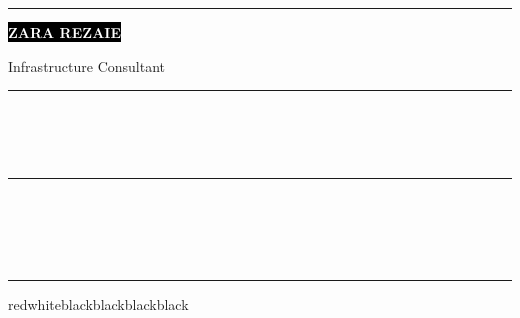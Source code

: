 \documentclass[9pt]{developercv} %
\begin{document}
	
	\begin{minipage}[t]{0.45\textwidth}\hrule height 0pt width 0pt%
		\colorbox{black}{{\HUGE\textcolor{white}{\textbf{\MakeUppercase{Zara Rezaie}}}}}%
		
		\vspace{1mm}\LARGE{Infrastructure Consultant}
	\end{minipage}%
	\begin{minipage}[t]{0.3\textwidth}\hrule height 0pt width 0pt%
		\small%
		\\
		\\
		\\
	\end{minipage}%
	\begin{minipage}[t]{0.3\textwidth}\hrule height 0pt width 0pt%
		\small%
		\\
		\\
	\end{minipage}%

	\vspace{0.5cm}
	
	
	\begin{minipage}[t]{0.4\textwidth}%
		\lorem \lorem \lorem \lorem \lorem\\
	\end{minipage}%
	\hfill
	\begin{minipage}[t]{0.5\textwidth}\hrule height 0pt width 0pt%
		\vspace{-10pt}%
		\begin{barchart}{10}{5.5}{red}{white}{black}{black}{black}{black}
		\end{barchart}
	\end{minipage}%
	
\end{document}
